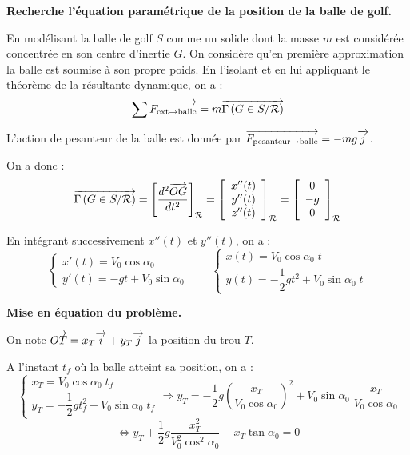 \documentclass[10pt]{article}
\begin{document}
\textbf{Recherche l'équation paramétrique de la position de la balle de golf.}


En modélisant la balle de golf \textbf{$S$} comme un solide dont la masse $m$ est considérée concentrée en son centre d'inertie $G$. On considère qu'en première approximation la balle est soumise à son propre poids.%
En l'isolant et en lui appliquant le théorème de la résultante dynamique, on a :
$$
\sum \overrightarrow{F_{\text{ext}\rightarrow \text{balle}}} = m\overrightarrow{\Gamma \left( {G} \in {S}/{\mathcal{R}}\right)}
$$

L'action de pesanteur de la balle est donnée par $\overrightarrow{F_{\text{pesanteur}\rightarrow \text{balle}}} = -mg\overrightarrow{j}$.


On a donc :
$$\overrightarrow{\Gamma \left( {G} \in {S}/{\mathcal{R}}\right)} = \left[ \dfrac{d^2 \overrightarrow{OG}}{dt^2}\right]_{\mathcal{R}}
=\left[ \begin{array}{c}
x''(t) \\ y''(t) \\ z''(t)
\end{array}\right]_{\mathcal{R}}
=\left[ \begin{array}{c}
0 \\ -g \\ 0
\end{array}\right]_{\mathcal{R}}
$$

En intégrant successivement $x''(t)$ et $y''(t)$, on a : 
$$
\left\{ 
\begin{array}{l}
x'(t) =  V_0 \cos\alpha_0\\ 
y'(t) =  -gt +V_0 \sin\alpha_0
\end{array}
\right.
\quad
\quad
\left\{ 
\begin{array}{l}
x(t) = V_0 \cos\alpha_0 \; t \\ 
y(t) = -\dfrac{1}{2}gt^2 +  V_0 \sin\alpha_0 \; t
\end{array}
\right.
$$

\textbf{Mise en équation du problème.}


On note $\overrightarrow{OT}=x_T\overrightarrow{i} + y_T\overrightarrow{j}$ la position du trou $T$. 

A l'instant $t_f$ où la balle atteint sa position, on a : 
$$
\left\{ 
\begin{array}{l}
x_T = V_0 \cos\alpha_0 \; t_f \\ 
y_T = -\dfrac{1}{2}gt_f^2 +  V_0 \sin\alpha_0 \; t_f
\end{array}
\right.
\Longrightarrow 
y_T = -\dfrac{1}{2}g \left(\dfrac{x_T}{V_0 \cos\alpha_0}\right) ^2 + V_0 \sin\alpha_0 \; \dfrac{x_T}{V_0 \cos\alpha_0}
$$
$$
\Longleftrightarrow 
y_T+\dfrac{1}{2}g \dfrac{x_T^2}{V_0^2 \cos^2\alpha_0} - x_T \tan\alpha_0 = 0
$$
\end{document}

